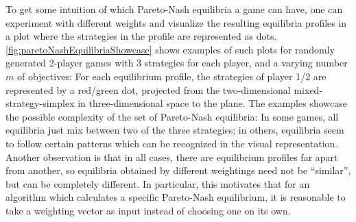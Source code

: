 \documentclass[a4paper]{scrreprt}
\begin{document}
    To get some intuition of which Pareto-Nash equilibria a game can have, one can experiment with different weights and visualize the resulting equilibria profiles in a plot where the strategies in the profile are represented as dots.
    \autoref{fig:paretoNashEquilibriaShowcase} %
    shows examples of such plots for randomly generated 2-player games with 3 strategies for each player, and a varying number $m$ of objectives: For each equilibrium profile, the strategies of player 1/2 are represented by a red/green dot, projected from the two-dimensional mixed-strategy-simplex in three-dimensional space to the plane.
    The examples showcase the possible complexity of the set of Pareto-Nash equilibria:
    In some games, all equilibria just mix between two of the three strategies; in others, equilibria seem to follow certain patterns which can be recognized in the visual representation.
    Another observation is that in all cases, there are equilibrium profiles far apart from another, so equilibria obtained by different weightings need not be “similar”, but can be completely different.
    In particular, this motivates that for an algorithm which calculates a specific Pareto-Nash equilibrium, it is reasonable to take a weighting vector as input instead of choosing one on its own.
\end{document}

